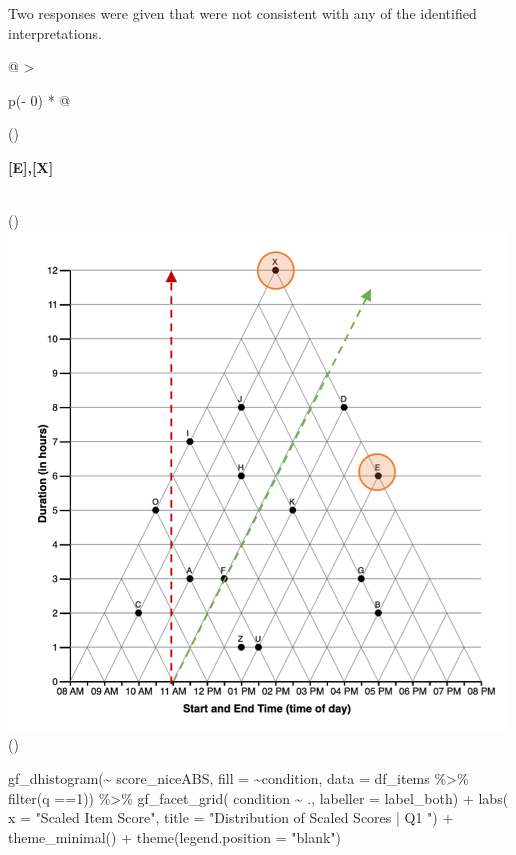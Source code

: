 \documentclass[
  letterpaper,
  DIV=11,
  numbers=noendperiod]{scrreprt}
\newenvironment{Shaded}{\begin{snugshade}}{\end{snugshade}}
\newcommand{\AttributeTok}[1]{\textcolor[rgb]{0.40,0.45,0.13}{#1}}
\newcommand{\DecValTok}[1]{\textcolor[rgb]{0.68,0.00,0.00}{#1}}
\newcommand{\FunctionTok}[1]{\textcolor[rgb]{0.28,0.35,0.67}{#1}}
\newcommand{\NormalTok}[1]{\textcolor[rgb]{0.00,0.23,0.31}{#1}}
\newcommand{\SpecialCharTok}[1]{\textcolor[rgb]{0.37,0.37,0.37}{#1}}
\newcommand{\StringTok}[1]{\textcolor[rgb]{0.13,0.47,0.30}{#1}}
\begin{document}
Two responses were given that were not consistent with any of the
identified interpretations.

\begin{longtable}[]{@{}
  >{\raggedright\arraybackslash}p{(\columnwidth - 0\tabcolsep) * }@{}}
\toprule()
\begin{minipage}[b]{\linewidth}\raggedright
\textbf{{[}E{]},{[}X{]}}
\end{minipage} \\
\midrule()
\endhead
\includegraphics{analysis/SGC3A/static/interpretations/Q1_121_EX.png} \\
\bottomrule()
\end{longtable}

\begin{Shaded}
\begin{Highlighting}[]
\FunctionTok{gf\_dhistogram}\NormalTok{(}\SpecialCharTok{\textasciitilde{}}\NormalTok{ score\_niceABS, }\AttributeTok{fill =} \SpecialCharTok{\textasciitilde{}}\NormalTok{condition, }\AttributeTok{data =}\NormalTok{ df\_items }\SpecialCharTok{\%\textgreater{}\%} \FunctionTok{filter}\NormalTok{(q }\SpecialCharTok{==}\DecValTok{1}\NormalTok{)) }\SpecialCharTok{\%\textgreater{}\%} 
  \FunctionTok{gf\_facet\_grid}\NormalTok{( condition }\SpecialCharTok{\textasciitilde{}}\NormalTok{ ., }\AttributeTok{labeller =}\NormalTok{ label\_both) }\SpecialCharTok{+} 
  \FunctionTok{labs}\NormalTok{( }\AttributeTok{x =} \StringTok{"Scaled Item Score"}\NormalTok{, }\AttributeTok{title =} \StringTok{"Distribution of Scaled Scores | Q1 "}\NormalTok{) }\SpecialCharTok{+} 
  \FunctionTok{theme\_minimal}\NormalTok{() }\SpecialCharTok{+} \FunctionTok{theme}\NormalTok{(}\AttributeTok{legend.position =} \StringTok{"blank"}\NormalTok{)}
\end{Highlighting}
\end{Shaded}
\end{document}
